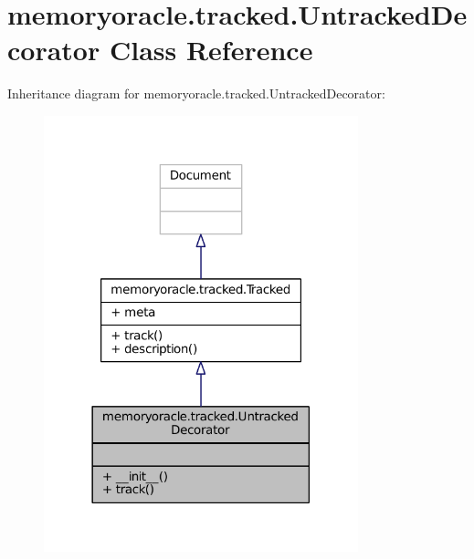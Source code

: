 \hypertarget{classmemoryoracle_1_1tracked_1_1UntrackedDecorator}{}\section{memoryoracle.\+tracked.\+Untracked\+Decorator Class Reference}
\label{classmemoryoracle_1_1tracked_1_1UntrackedDecorator}


Inheritance diagram for memoryoracle.\+tracked.\+Untracked\+Decorator\+:
\nopagebreak
\begin{figure}[H]
\begin{center}
\leavevmode
\includegraphics[width=258pt]{classmemoryoracle_1_1tracked_1_1UntrackedDecorator__inherit__graph}
\end{center}
\end{figure}


